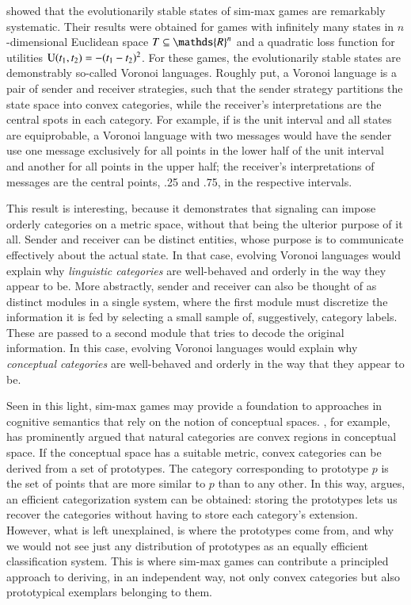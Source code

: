 \documentclass[fleqn,reqno,10pt]{article}
\begin{document}
\citet{JagerMetzger2011:Voronoi-Languag} showed that the
evolutionarily stable states of sim-max games are remarkably
systematic. Their results were obtained for games with infinitely many
states in $n$-dimensional Euclidean space $\States \subseteq
\mathds{R}^n$ and a quadratic loss function for utilities
$\mathrm{U}(t_{\mathrm{1}}, t_{\mathrm{2}}) = - (t_{\mathrm{1}} -
t_{\mathrm{2}})^2$. For these games, the evolutionarily stable states are
demonstrably so-called Voronoi languages. Roughly put, a Voronoi
language is a pair of sender and receiver strategies, such that the
sender strategy partitions the state space into convex categories,
while the receiver's interpretations are the central spots in each
category. For example, if \States is the unit interval and all states
are equiprobable, a Voronoi language with two messages would have the
sender use one message exclusively for all points in the lower half of
the unit interval and another for all points in the upper half; the
receiver's interpretations of messages are the central points, .25 and
.75, in the respective intervals.

This result is interesting, because it demonstrates that signaling can
impose orderly categories on a metric space, without that being the
ulterior purpose of it all. Sender and receiver can be distinct
entities, whose purpose is to communicate effectively about the actual
state. In that case, evolving Voronoi languages would explain why
\emph{linguistic categories} are well-behaved and orderly in the way
they appear to be. More abstractly, sender and receiver can also be
thought of as distinct modules in a single system, where the first
module must discretize the information it is fed by selecting a small
sample of, suggestively, category labels. These are passed to a second
module that tries to decode the original information. In this case,
evolving Voronoi languages would explain why \emph{conceptual
  categories} are well-behaved and orderly in the way that they appear
to be.

Seen in this light, sim-max games may provide a foundation to
approaches in cognitive semantics that rely on the notion of
conceptual spaces.  \citet[][70--77]{Gardenfors2000:Conceptual-Spac},
for example, has prominently argued that natural categories are convex
regions in conceptual space. If the conceptual space has a suitable
metric, convex categories can be derived from a set of prototypes. The
category corresponding to prototype $p$ is the set of points that are
more similar to $p$ than to any other. In this way,
\citet{Gardenfors2000:Conceptual-Spac} argues, an efficient
categorization system can be obtained: storing the prototypes lets us
recover the categories without having to store each category's
extension. However, what is left unexplained, is where the prototypes
come from, and why we would not see just any distribution of
prototypes as an equally efficient classification system. This is
where sim-max games can contribute a principled approach to deriving,
in an independent way, not only convex categories but also
prototypical exemplars belonging to them.
\end{document}
